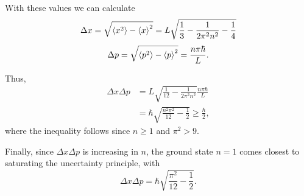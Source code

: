 \documentclass[11pt]{article}
\begin{document}
\begin{answer}
With these values we can calculate
\begin{equation}
\label{eq:6}
\Delta x = \sqrt{\ev{x^2} - \ev{x}^2} = L\sqrt{\frac{1}{3} - \frac{1}{2\pi^2n^2} - \frac{1}{4}}
\end{equation}
\begin{equation}
\label{eq:7}
\Delta p = \sqrt{\ev{p^2} - \ev{p}^2}
= \frac{n\pi\hbar}{L}.
\end{equation}

Thus,
\begin{equation}
\label{eq:8}
\begin{aligned}
\Delta x \Delta p
&= L\sqrt{\frac{1}{12} - \frac{1}{2\pi^2n^2}}
\frac{n\pi\hbar}{L} \\
&= \hbar\sqrt{\frac{n^2\pi^2}{12} - \frac{1}{2}}
\geq \frac{\hbar}{2},
\end{aligned}
\end{equation}
where the inequality follows since \(n \geq 1\) and
\(\pi^2 > 9\).

Finally, since \(\Delta x\Delta p\) is increasing in
\(n\), the ground state \(n=1\) comes closest to
saturating the uncertainty principle, with
\begin{equation}
\label{eq:9}
\Delta x\Delta p
= \hbar\sqrt{\frac{\pi^2}{12} - \frac{1}{2}}.
\end{equation}
\end{answer}
\end{document}
